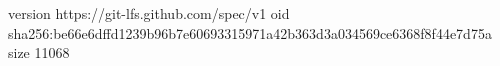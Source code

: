 version https://git-lfs.github.com/spec/v1
oid sha256:be66e6dffd1239b96b7e60693315971a42b363d3a034569ce6368f8f44e7d75a
size 11068

